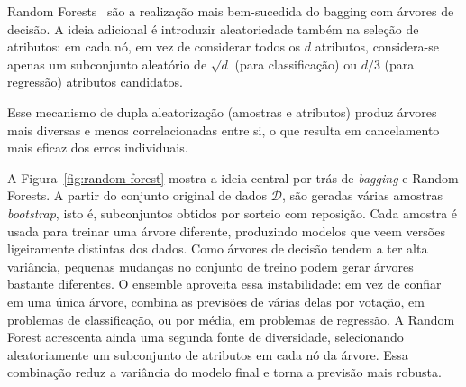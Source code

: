 \documentclass[12pt,a4paper]{article}
\begin{document}
Random Forests~\citep{breiman2001random} são a realização mais bem-sucedida do bagging com árvores de decisão. A ideia adicional é introduzir aleatoriedade também na seleção de atributos: em cada nó, em vez de considerar todos os $d$ atributos, considera-se apenas um subconjunto aleatório de $\sqrt{d}$ (para classificação) ou $d/3$ (para regressão) atributos candidatos.

Esse mecanismo de dupla aleatorização (amostras e atributos) produz árvores mais diversas e menos correlacionadas entre si, o que resulta em cancelamento mais eficaz dos erros individuais.

A Figura~\ref{fig:random-forest} mostra a ideia central por trás de \textit{bagging} e Random Forests. A partir do conjunto original de dados $\mathcal{D}$, são geradas várias amostras \textit{bootstrap}, isto é, subconjuntos obtidos por sorteio com reposição. Cada amostra é usada para treinar uma árvore diferente, produzindo modelos que veem versões ligeiramente distintas dos dados. Como árvores de decisão tendem a ter alta variância, pequenas mudanças no conjunto de treino podem gerar árvores bastante diferentes. O ensemble aproveita essa instabilidade: em vez de confiar em uma única árvore, combina as previsões de várias delas por votação, em problemas de classificação, ou por média, em problemas de regressão. A Random Forest acrescenta ainda uma segunda fonte de diversidade, selecionando aleatoriamente um subconjunto de atributos em cada nó da árvore. Essa combinação reduz a variância do modelo final e torna a previsão mais robusta.
\end{document}
